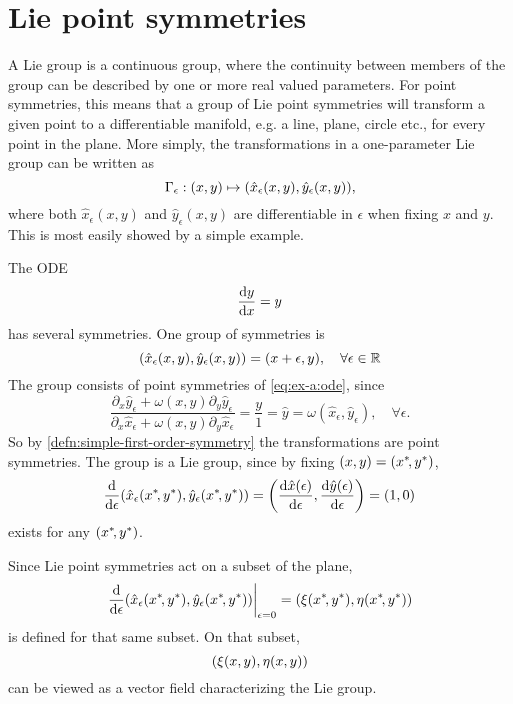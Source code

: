 \section{Lie point symmetries}
A Lie group is a continuous group, where the continuity between members of the group can be described by one or more real valued parameters.
For point symmetries, this means that a group of Lie point symmetries will transform a given point to a differentiable manifold, e.g. a line, plane, circle etc., for every point in the plane.
More simply, the transformations in a one-parameter Lie group can be written as
\begin{equation}
  \Gamma_\epsilon: \pqty{x,y} \mapsto \pqty{\hat{x}_\epsilon(x,y), \hat{y}_\epsilon(x,y)},
\end{equation}
where both \(\hat{x}_\epsilon(x,y)\) and \(\hat{y}_\epsilon(x,y)\) are differentiable in \(\epsilon\) when fixing \(x\) and \(y\).
This is most easily showed by a simple example.
\begin{exmp}
  The ODE
  \begin{equation} \label{eq:ex-a:ode}
    \dv{y}{x} = y
  \end{equation}
  has several symmetries.
  One group of symmetries is
  \begin{equation} \label{eq:ex-a:transformation}
    \pqty{\hat{x}_\epsilon(x,y), \hat{y}_\epsilon(x,y)} = \pqty{x + \epsilon, y}, \quad
    \forall \epsilon \in \reals
  \end{equation}
  The group consists of point symmetries of \cref{eq:ex-a:ode}, since
  \begin{equation}
    \frac{\partial_x \hat{y}_\epsilon + \omega(x,y) \partial_y \hat{y}_\epsilon}{\partial_x \hat{x}_\epsilon + \omega(x,y) \partial_y \hat{x}_\epsilon} =
    \frac{y}{1} =
    \hat{y} =
    \omega(\hat{x}_\epsilon,\hat{y}_\epsilon), \quad
    \forall \epsilon.
  \end{equation}
  So by \cref{defn:simple-first-order-symmetry} the transformations are point symmetries.
  The group is a Lie group, since by fixing \(\pqty{x,y}=\pqty{x^*\!,y^*}\),
  \begin{equation}
    \dv{\epsilon} \pqty{\hat{x}_\epsilon(x^*\!,y^*), \hat{y}_\epsilon(x^*\!,y^*)} =
    \pqty{\dv{\hat{x}(\epsilon)}{\epsilon}, \dv{\hat{y}(\epsilon)}{\epsilon}} =
    \pqty{1,0}
  \end{equation}
  exists for any \(\pqty{x^*\!,y^*}\).
\end{exmp}
Since Lie point symmetries act on a subset of the plane,
\begin{equation}
  \eval{\dv{\epsilon} \pqty{\hat{x}_\epsilon(x^*\!,y^*), \hat{y}_\epsilon(x^*\!,y^*)}}_{\epsilon=0} = \pqty{\xi(x^*\!,y^*), \eta(x^*\!,y^*)}
\end{equation}
is defined for that same subset. %
On that subset,
\begin{equation}
  \pqty{\xi(x,y), \eta(x,y)}
\end{equation}
can be viewed as a vector field characterizing the Lie group.


